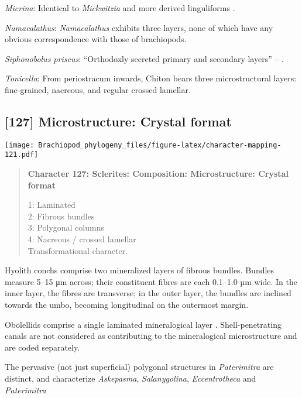 \documentclass[openany]{book}
\theoremstyle{definition}
\theoremstyle{definition}
\theoremstyle{definition}
\theoremstyle{remark}
\begin{document}
\hypertarget{Micrina-coding-126}{}
\emph{Micrina}: Identical to \emph{Mickwitzia} and more derived
linguliforms \citep{Holmer2011Firstrecord}.

\hypertarget{Namacalathus-coding-126}{}
\emph{Namacalathus}: \emph{Namacalathus} exhibits three layers, none of
which have any obvious correspondence with those of brachiopods.

\hypertarget{Siphonobolus_priscus-coding-126}{}
\emph{Siphonobolus priscus}: ``Orthodoxly secreted primary and secondary
layers'' -- \citet{Williams2004Chemicostructure}.

\hypertarget{Tonicella-coding-126}{}
\emph{Tonicella}: From periostracum inwards, Chiton bears three
microstructural layers: fine-grained, nacreous, and regular crossed
lamellar.

\subsection*{{[}127{]} Microstructure: Crystal
format}\label{microstructure-crystal-format}

\texttt{[image: Brachiopod\_phylogeny\_files/figure-latex/character-mapping-121.pdf]}

\begin{quote}
\textbf{Character 127: Sclerites: Composition: Microstructure: Crystal
format}

1: Laminated\\
2: Fibrous bundles\\
3: Polygonal columns\\
4: Nacreous / crossed lamellar\\
Transformational character.
\end{quote}

Hyolith conchs comprise two mineralized layers of fibrous bundles.
Bundles measure 5--15 μm across; their constituent fibres are each
0.1--1.0 µm wide. In the inner layer, the fibres are transverse; in the
outer layer, the bundles are inclined towards the umbo, becoming
longitudinal on the outermost margin.

Obolellids comprise a single laminated mineralogical layer
\citep{Balthasar2008iMummpikia}. Shell-penetrating canals are not
considered as contributing to the mineralogical microstructure and are
coded separately.

The pervasive (not just superficial) polygonal structures in
\emph{Paterimitra} are distinct, and characterize \emph{Askepasma},
\emph{Salanygolina}, \emph{Eccentrotheca} and \emph{Paterimitra}
\citep{Larsson2014iPaterimitra}
\end{document}
